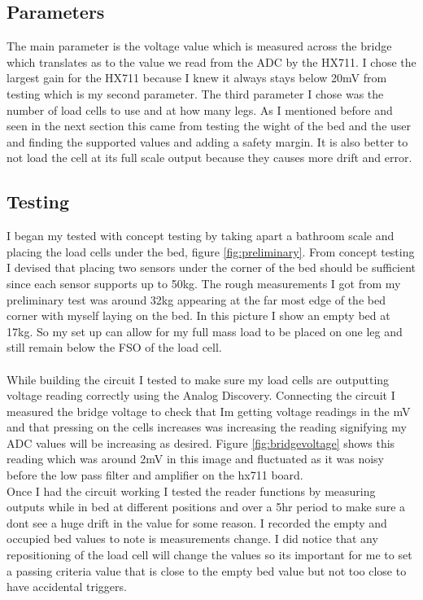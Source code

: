 \documentclass[11pt]{article}
\begin{document}
\subsection*{Parameters}
The main parameter is the voltage value which is measured across the bridge which translates as to the value we read from the ADC by the HX711.
I chose the largest gain for the HX711 because I knew it always stays below 20mV from testing which is my second parameter. 
The third parameter I chose was the number of load cells to use and at how many legs. 
As I mentioned before and seen in the next section this came from testing the wight of the bed and the user and finding the supported values and adding a safety margin. 
It is also better to not load the cell at its full scale output because they causes more drift and error. 

\subsection*{Testing}
I began my tested with concept testing by taking apart a bathroom scale and placing the load cells under the bed, figure \ref{fig:preliminary}.
From concept testing I devised that placing two sensors under the corner of the bed should be sufficient since each sensor supports up to 50kg. 
The rough measurements I got from my preliminary test was around 32kg appearing at the far most edge of the bed corner with myself laying on the bed.
In this picture I show an empty bed at 17kg.
So my set up can allow for my full mass load to be placed on one leg and still remain below the FSO of the load cell. \\
\\
While building the circuit I tested to make sure my load cells are outputting voltage reading correctly using the Analog Discovery.
Connecting the circuit I measured the bridge voltage to check that Im getting voltage readings in the mV and that pressing on the cells increases was increasing the reading signifying my ADC values will be increasing as desired.
Figure \ref{fig:bridgevoltage} shows this reading which was around 2mV in this image and fluctuated as it was noisy before the low pass filter and amplifier on the hx711 board. 
\\
Once I had the circuit working I tested the reader functions by measuring outputs while in bed at different positions and over a 5hr period to make sure a dont see a huge drift in the value for some reason.
I recorded the empty and occupied bed values to note is measurements change.
I did notice that any repositioning of the load cell will change the values so its important for me to set a passing criteria value that is close to the empty bed value but not too close to have accidental triggers.
\end{document}
